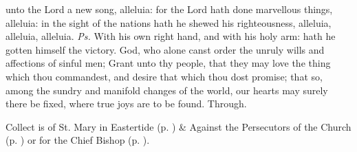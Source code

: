 \properantiphonfix

\introit
{} unto the Lord a new song, alleluia: for the Lord hath done marvellous things, alleluia: in the sight of the nations hath he shewed his righteousness, alleluia, alleluia, alleluia. \textit{Ps.} With his own right hand, and with his holy arm: hath he gotten himself the victory.
\collect
{} God, who alone canst order the unruly wills and affections of sinful men; Grant unto thy people, that they may love the thing which thou commandest, and desire that which thou dost promise; that so, among the sundry and manifold changes of the world, our hearts may surely there be fixed, where true joys are to be found. Through.
\begin{rubric}
     Collect is of St. Mary in Eastertide (p. \pageref{SPMaryInEaster}) \&  Against the Persecutors of the Church (p. \pageref{SPAgainst}) or for the Chief Bishop (p. \pageref{SPChiefBishop}).
\end{rubric}


